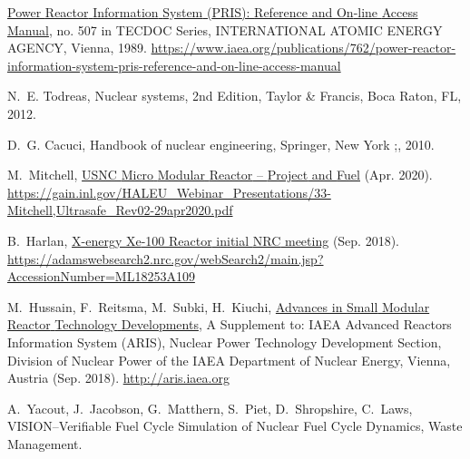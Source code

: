 \documentclass[preprint]{elsarticle}
\begin{document}
\begin{thebibliography}{10}
\href{https://www.iaea.org/publications/762/power-reactor-information-system-pris-reference-and-on-line-access-manual}{Power
  {Reactor} {Information} {System} ({PRIS}): {Reference} and {On}-line {Access}
  {Manual}}, no. 507 in {TECDOC} {Series}, INTERNATIONAL ATOMIC ENERGY AGENCY,
  Vienna, 1989.
\newline\urlprefix\url{https://www.iaea.org/publications/762/power-reactor-information-system-pris-reference-and-on-line-access-manual}

N.~E. Todreas, Nuclear systems, 2nd Edition, Taylor \& Francis, Boca Raton, FL,
  2012.

D.~G. Cacuci, Handbook of nuclear engineering, Springer, New York ;, 2010.

M.~Mitchell,
  \href{https://gain.inl.gov/HALEU_Webinar_Presentations/33-Mitchell,Ultrasafe_Rev02-29apr2020.pdf}{{USNC}
  {Micro} {Modular} {Reactor} – {Project} and {Fuel}} (Apr. 2020).
\newline\urlprefix\url{https://gain.inl.gov/HALEU_Webinar_Presentations/33-Mitchell,Ultrasafe_Rev02-29apr2020.pdf}

B.~Harlan,
  \href{https://adamswebsearch2.nrc.gov/webSearch2/main.jsp?AccessionNumber=ML18253A109}{X-energy
  {Xe}-100 {Reactor} initial {NRC} meeting} (Sep. 2018).
\newline\urlprefix\url{https://adamswebsearch2.nrc.gov/webSearch2/main.jsp?AccessionNumber=ML18253A109}

M.~Hussain, F.~Reitsma, M.~Subki, H.~Kiuchi,
  \href{http://aris.iaea.org}{Advances in {Small} {Modular} {Reactor}
  {Technology} {Developments}}, A {Supplement} to: {IAEA} {Advanced} {Reactors}
  {Information} {System} ({ARIS}), Nuclear Power Technology Development
  Section, Division of Nuclear Power of the IAEA Department of Nuclear Energy,
  Vienna, Austria (Sep. 2018).
\newline\urlprefix\url{http://aris.iaea.org}

A.~Yacout, J.~Jacobson, G.~Matthern, S.~Piet, D.~Shropshire, C.~Laws,
  {VISION}–{Verifiable} {Fuel} {Cycle} {Simulation} of {Nuclear} {Fuel}
  {Cycle} {Dynamics}, Waste Management.

\end{thebibliography}


%
\end{document}
